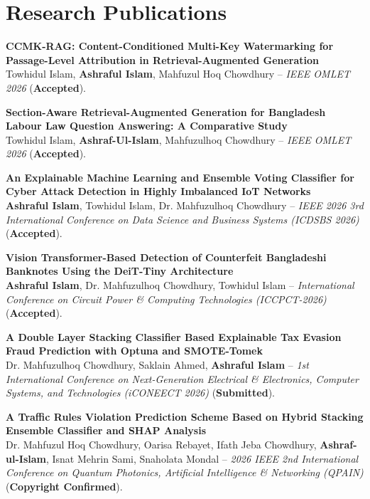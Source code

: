 \documentclass[a4paper,10pt]{article}
\begin{document}
\section{Research Publications}
\begin{itemize}[leftmargin=12pt, topsep=1pt, itemsep=2.5pt]
  \small{
    \item \textbf{CCMK-RAG: Content-Conditioned Multi-Key Watermarking for Passage-Level Attribution in Retrieval-Augmented Generation} \\
    Towhidul Islam, \textbf{Ashraful Islam}, Mahfuzul Hoq Chowdhury -- \textit{IEEE OMLET 2026} (\textbf{Accepted}).
    
    \item \textbf{Section-Aware Retrieval-Augmented Generation for Bangladesh Labour Law Question Answering: A Comparative Study} \\
    Towhidul Islam, \textbf{Ashraf-Ul-Islam}, Mahfuzulhoq Chowdhury -- \textit{IEEE OMLET 2026} (\textbf{Accepted}).
    
    \item \textbf{An Explainable Machine Learning and Ensemble Voting Classifier for Cyber Attack Detection in Highly Imbalanced IoT Networks} \\
    \textbf{Ashraful Islam}, Towhidul Islam, Dr. Mahfuzulhoq Chowdhury -- \textit{IEEE 2026 3rd International Conference on Data Science and Business Systems (ICDSBS 2026)} (\textbf{Accepted}).
    
    \item \textbf{Vision Transformer-Based Detection of Counterfeit Bangladeshi Banknotes Using the DeiT-Tiny Architecture} \\
    \textbf{Ashraful Islam}, Dr. Mahfuzulhoq Chowdhury, Towhidul Islam -- \textit{International Conference on Circuit Power \& Computing Technologies (ICCPCT-2026)} (\textbf{Accepted}).
    
    \item \textbf{A Double Layer Stacking Classifier Based Explainable Tax Evasion Fraud Prediction with Optuna and SMOTE-Tomek} \\
    Dr. Mahfuzulhoq Chowdhury, Saklain Ahmed, \textbf{Ashraful Islam} -- \textit{1st International Conference on Next-Generation Electrical \& Electronics, Computer Systems, and Technologies (iCONEECT 2026)} (\textbf{Submitted}).
    
    \item \textbf{A Traffic Rules Violation Prediction Scheme Based on Hybrid Stacking Ensemble Classifier and SHAP Analysis} \\
    Dr. Mahfuzul Hoq Chowdhury, Oarisa Rebayet, Ifath Jeba Chowdhury, \textbf{Ashraf-ul-Islam}, Isnat Mehrin Sami, Snaholata Mondal -- \textit{2026 IEEE 2nd International Conference on Quantum Photonics, Artificial Intelligence \& Networking (QPAIN)} (\textbf{Copyright Confirmed}).
  }
\end{itemize}
\end{document}
